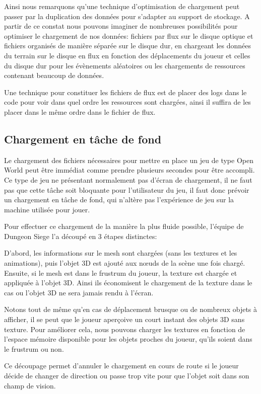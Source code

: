 \documentclass[a4paper, 11pt]{article} %
\begin{document}
Ainsi nous remarquons qu'une technique d'optimisation de chargement peut passer par la duplication des données pour s'adapter au support de stockage. A partir de ce constat nous pouvons imaginer de nombreuses possibilités pour optimiser le chargement de nos données: fichiers par flux sur le disque optique et fichiers organisés de manière séparée sur le disque dur, en chargeant les données du terrain sur le disque en flux en fonction des déplacements du joueur et celles du disque dur pour les évènements aléatoires ou les chargements de ressources contenant beaucoup de données.

Une technique pour constituer les fichiers de flux est de placer des logs dans le code pour voir dans quel ordre les ressources sont chargées, ainsi il suffira de les placer dans le même ordre dans le fichier de flux.
\newpage
\subsection*{Chargement en tâche de fond}
Le chargement des fichiers nécessaires pour mettre en place un jeu de type Open World peut être immédiat comme prendre plusieurs secondes pour être accompli. Ce type de jeu ne présentant normalement pas d'écran de chargement, il ne faut pas que cette tâche soit bloquante pour l'utilisateur du jeu, il faut donc prévoir un chargement en tâche de fond, qui n'altère pas l'expérience de jeu sur la machine utilisée pour jouer.

Pour effectuer ce chargement de la manière la plus fluide possible, l'équipe de Dungeon Siege l'a découpé en 3 étapes distinctes\cite{industry:dungeonsiege-streaming}: 

D'abord, les informations sur le mesh sont chargées (sans les textures et les animations), puis l'objet 3D est ajouté aux nœuds de la scène une fois chargé. Ensuite, si le mesh est dans le frustrum du joueur, la texture est chargée et appliquée à l'objet 3D. Ainsi ils économisent le chargement de la texture dans le cas ou l'objet 3D ne sera jamais rendu à l'écran. 

Notons tout de même qu'en cas de déplacement brusque ou de nombreux objets à afficher, il se peut que le joueur aperçoive un court instant des objets 3D sans texture. Pour améliorer cela, nous pouvons charger les textures en fonction de l'espace mémoire disponible pour les objets proches du joueur, qu'ils soient dans le frustrum ou non.

Ce découpage permet d'annuler le chargement en cours de route si le joueur décide de changer de direction ou passe trop vite pour que l'objet soit dans son champ de vision.
\end{document}
